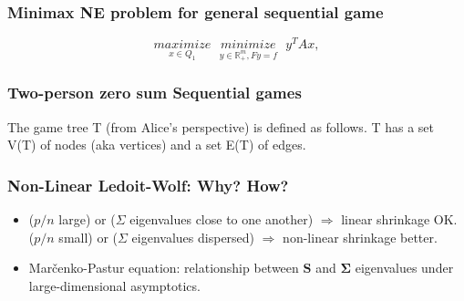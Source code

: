 \documentclass[xcolor=dvipsnames]{beamer}
\def\B#1{\bm{#1}}
\begin{document}
\begin{frame}
  \frametitle{Minimax NE problem for general sequential game}
  \begin{equation}
    \underset{x \in Q_1}{maximize}\text{ }\underset{y \in \mathbb{R}_+^m, Fy=f}{minimize}\text{ }y^TAx,
  \end{equation}

\end{frame}

\begin{frame}
  \frametitle{Two-person zero sum Sequential games}
    The game tree T (from Alice's perspective) is defined as follows.
    T has a set V(T) of nodes (aka vertices) and a set E(T) of edges.
\end{frame}
  

\begin{frame}
  \frametitle{Non-Linear Ledoit-Wolf: Why? How?}

  \begin{itemize}
  \item ($p/n$ large) or ($\Sigma$ eigenvalues close to one another)
    $\Rightarrow$ linear shrinkage OK.\\($p/n$ small) or ($\Sigma$
    eigenvalues dispersed) $\Rightarrow$ non-linear shrinkage better.
  \item Mar\v{c}enko-Pastur equation: relationship between $\B{S}$ and
    $\B{\Sigma}$ eigenvalues under large-dimensional asymptotics.
  \end{itemize}
\end{frame}
\end{document}
